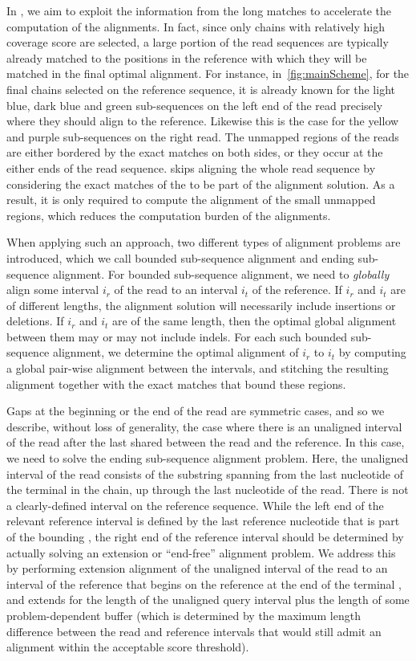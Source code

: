 In \puffaligner, we aim to exploit the information from the long
matches to accelerate the computation of the alignments. In fact,
since only chains with relatively high coverage score are
selected, a large portion of the read sequences are typically already
matched to the positions in the reference with which they will be
matched in the final optimal alignment. For instance,
in~\cref{fig:mainScheme}, for the final chains selected on the
reference sequence, it is already known for the light blue, dark blue
and green sub-sequences on the left end of the read precisely where
they should align to the reference. Likewise this is the case for the yellow and
purple sub-sequences on the right read. The unmapped regions of the
reads are either bordered by the exact matches on both sides, 
or they occur at the either ends of the read sequence.
\puffaligner skips aligning the whole read sequence by considering
the exact matches of the \mems to be part of the alignment solution.
As a result, it is only required to compute the alignment of the
small unmapped regions, which reduces the computation burden of the
alignments.

When applying such an approach, two different types of alignment
problems are introduced, which we call bounded sub-sequence alignment
and ending sub-sequence alignment. For bounded sub-sequence alignment, we need
to \emph{globally} align some interval $i_r$ of the read to an
interval $i_t$ of the reference. If $i_r$ and $i_t$ are of different
lengths, the alignment solution will necessarily include insertions
or deletions. If $i_r$ and $i_t$ are of the same length, then the
optimal global alignment between them may or may not include indels.
For each such bounded sub-sequence alignment, we determine the
optimal alignment of $i_r$ to $i_t$ by computing a global pair-wise
alignment between the intervals, and stitching the resulting
alignment together with the exact matches that bound these regions.

Gaps at the beginning or the end of the read are symmetric cases, and so we
describe, without loss of generality, the case where there is an unaligned
interval of the read after the last \mem shared between the read and the
reference. In this case, we need to solve the ending sub-sequence alignment
problem. Here, the unaligned interval of the read consists of the substring
spanning from the last nucleotide of the terminal \mem in the chain, up through
the last nucleotide of the read. There is not a clearly-defined interval on
the reference sequence. While the left end of the relevant reference interval
is defined by the last reference nucleotide that is part of the bounding \mem,
the right end of the reference interval should be determined by actually solving
an extension or ``end-free'' alignment problem. We address this by performing
extension alignment of the unaligned interval of the read to an interval of the
reference that begins on the reference at the end of the terminal \mem, and
extends for the length of the unaligned query interval plus the length of some
problem-dependent buffer (which is determined by the maximum length difference  
between the read and reference intervals that would still admit an alignment
within the acceptable score threshold).

